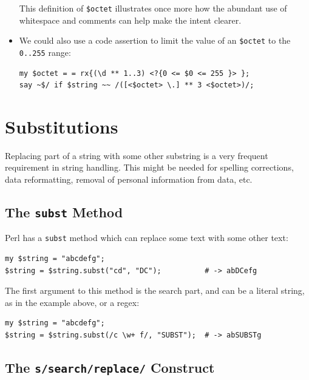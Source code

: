 \begin{itemize}
This definition of \verb'$octet' illustrates once more how 
the abundant use of whitespace and comments can help make 
the intent clearer.

\item We could also use 
a code assertion to limit the value of an \verb'$octet' to 
the \verb'0..255' range:

\begin{verbatim}
my $octet = = rx{(\d ** 1..3) <?{0 <= $0 <= 255 }> };
say ~$/ if $string ~~ /([<$octet> \.] ** 3 <$octet>)/;
\end{verbatim}
%

\end{itemize}


\section{Substitutions}
\label{substitutions}

Replacing part of a string with some other substring is a 
very frequent requirement in string handling. This might be 
needed for spelling corrections, data reformatting, removal 
of personal information from data, etc. 

\subsection{The {\tt subst} Method}

Perl has a {\tt subst} method which can replace some text with 
some other text:

\begin{verbatim}
my $string = "abcdefg";
$string = $string.subst("cd", "DC");          # -> abDCefg
\end{verbatim}

The first argument to this method is the search part, and 
can be a literal string, as in the example above, or a regex:

\begin{verbatim}
my $string = "abcdefg";
$string = $string.subst(/c \w+ f/, "SUBST");  # -> abSUBSTg
\end{verbatim}

\subsection{The {\tt s/search/replace/} Construct}

